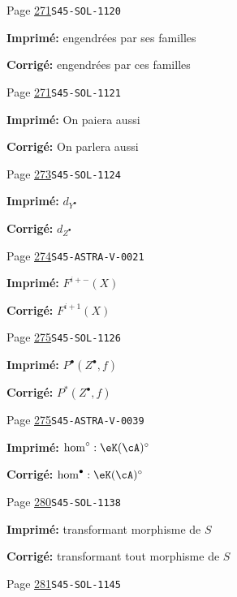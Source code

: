 \begin{description}
\smallskip
\item[\hypertarget{apparatus:FR-0280}{280}] Page \hyperlink{printpage:fr:271}{271}\quad\texttt{S45-SOL-1120}
\par\noindent\textbf{Imprimé:} engendrées par ses familles
\par\noindent\textbf{Corrigé:} engendrées par ces familles
\smallskip
\item[\hypertarget{apparatus:FR-0281}{281}] Page \hyperlink{printpage:fr:271}{271}\quad\texttt{S45-SOL-1121}
\par\noindent\textbf{Imprimé:} On paiera aussi
\par\noindent\textbf{Corrigé:} On parlera aussi
\smallskip
\item[\hypertarget{apparatus:FR-0282}{282}] Page \hyperlink{printpage:fr:273}{273}\quad\texttt{S45-SOL-1124}
\par\noindent\textbf{Imprimé:} \(d_{Y^\bullet}\)
\par\noindent\textbf{Corrigé:} \(d_{Z^\bullet}\)
\smallskip
\item[\hypertarget{apparatus:FR-0283}{283}] Page \hyperlink{printpage:fr:274}{274}\quad\texttt{S45-ASTRA-V-0021}
\par\noindent\textbf{Imprimé:} \(F^{i+-}(X)\)
\par\noindent\textbf{Corrigé:} \(F^{i+1}(X)\)
\smallskip
\item[\hypertarget{apparatus:FR-0284}{284}] Page \hyperlink{printpage:fr:275}{275}\quad\texttt{S45-SOL-1126}
\par\noindent\textbf{Imprimé:} \(P^\bullet(Z^\bullet,f)\)
\par\noindent\textbf{Corrigé:} \(P^\ast(Z^\bullet,f)\)
\smallskip
\item[\hypertarget{apparatus:FR-0285}{285}] Page \hyperlink{printpage:fr:275}{275}\quad\texttt{S45-ASTRA-V-0039}
\par\noindent\textbf{Imprimé:} \(\hom^\circ:\eK(\cA)^\circ\)
\par\noindent\textbf{Corrigé:} \(\hom^\bullet:\eK(\cA)^\circ\)
\smallskip
\item[\hypertarget{apparatus:FR-0286}{286}] Page \hyperlink{printpage:fr:280}{280}\quad\texttt{S45-SOL-1138}
\par\noindent\textbf{Imprimé:} transformant morphisme de $S$
\par\noindent\textbf{Corrigé:} transformant tout morphisme de $S$
\smallskip
\item[\hypertarget{apparatus:FR-0287}{287}] Page \hyperlink{printpage:fr:281}{281}\quad\texttt{S45-SOL-1145}

\end{description}
